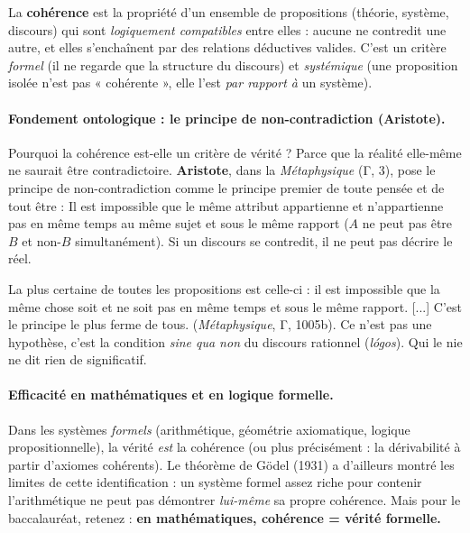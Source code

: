 \documentclass[11pt]{article}
\newcommand{\cle}[1]{{\popxbold\color{popdark}#1}}
\begin{document}
\begin{definition}[Cohérence]
La \textbf{cohérence} est la propriété d'un ensemble de propositions (théorie, système, discours) qui sont \emph{logiquement compatibles} entre elles : aucune ne contredit une autre, et elles s'enchaînent par des relations déductives valides. C'est un critère \emph{formel} (il ne regarde que la structure du discours) et \emph{systémique} (une proposition isolée n'est pas « cohérente », elle l'est \emph{par rapport à} un système).
\end{definition}

\paragraph{Fondement ontologique : le principe de non-contradiction (Aristote).}
Pourquoi la cohérence est-elle un critère de vérité ? Parce que la réalité elle-même ne saurait être contradictoire. \textbf{Aristote}, dans la \emph{Métaphysique} (Γ, 3), pose le \cle{principe de non-contradiction} comme le principe premier de toute pensée et de tout être : \guillemotleft Il est impossible que le même attribut appartienne et n'appartienne pas en même temps au même sujet et sous le même rapport \guillemotright ($A$ ne peut pas être $B$ et non-$B$ simultanément). Si un discours se contredit, il ne peut pas décrire le réel.

\begin{propriete}
\guillemotleft La plus certaine de toutes les propositions est celle-ci : il est impossible que la même chose soit et ne soit pas en même temps et sous le même rapport. [...] C'est le principe le plus ferme de tous. \guillemotright (\emph{Métaphysique}, Γ, 1005b). Ce n'est pas une hypothèse, c'est la condition \emph{sine qua non} du discours rationnel (\emph{lógos}). Qui le nie ne dit rien de significatif.
\end{propriete}

\paragraph{Efficacité en mathématiques et en logique formelle.}
Dans les systèmes \emph{formels} (arithmétique, géométrie axiomatique, logique propositionnelle), la vérité \emph{est} la cohérence (ou plus précisément : la \cle{dérivabilité} à partir d'axiomes cohérents). Le théorème de Gödel (1931) a d'ailleurs montré les limites de cette identification : un système formel assez riche pour contenir l'arithmétique ne peut pas démontrer \emph{lui-même} sa propre cohérence. Mais pour le baccalauréat, retenez : \textbf{en mathématiques, cohérence = vérité formelle.}
\end{document}
